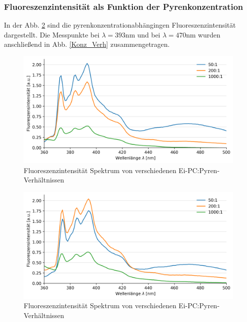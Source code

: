 \subsubsection{Fluoreszenzintensität als Funktion der Pyrenkonzentration}\label{sec:F_von_C}
In der Abb. \ref{Konz_Scan} sind die pyrenkonzentrationabhängingen Fluoreszenzintensität dargestellt. Die Messpunkte bei $\lambda=393$nm und bei $\lambda=470$nm wurden anschließend in Abb. \ref{Konz_Verh} zusammengetragen.

\begin{figure}[h!]
	\begin{center}
		\begin{minipage}{0,8\textwidth}
			
			\includegraphics[width=\textwidth]{analysis/reports/Konz_Device3.png}
			\caption{Fluoreszenzintensität Spektrum von verschiedenen Ei-PC:Pyren-Verhältnissen} 
			\label{Konz_Scan} 
		\end{minipage}
	\end{center}
\end{figure}
\begin{figure}[h!]
	\begin{center}
		\begin{minipage}{0,8\textwidth}
			
			\includegraphics[width=\textwidth]{analysis/reports/Konz_Device4.png}
			\caption{Fluoreszenzintensität Spektrum von verschiedenen Ei-PC:Pyren-Verhältnissen} 
			\label{Konz_Scan} 
		\end{minipage}
	\end{center}
\end{figure}
